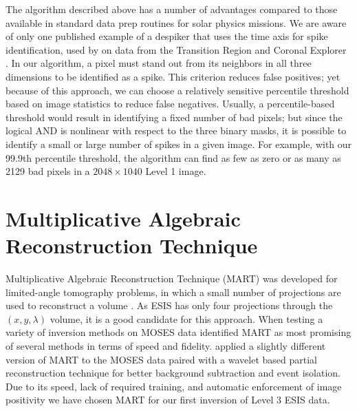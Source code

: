 The algorithm described above has a number of advantages compared to those available in standard data prep routines for solar physics missions. 
We are aware of only one published example of a despiker that uses the time axis for spike identification, used by \citet{Aschwanden2000(trace_unspike_time)} on data from the Transition Region and Coronal Explorer \citep[TRACE]{handy1999}. 
In our algorithm, a pixel must stand out from its neighbors in all three dimensions to be identified as a spike.
This criterion reduces false positives; yet because of this approach, we can choose a relatively sensitive percentile threshold based on image statistics to reduce false negatives. 
Usually, a percentile-based threshold would result in identifying a fixed number of bad pixels; but since the logical AND is nonlinear with respect to the three binary masks, it is possible to identify a small or large number of spikes in a given image. 
For example, with our 99.9th percentile threshold, the algorithm can find as few as zero or as many as 2129 bad pixels in a $2048\times 1040$ Level 1 image. 

\section{Multiplicative Algebraic Reconstruction Technique}\label{MART}
	Multiplicative Algebraic Reconstruction Technique (MART) was developed for limited-angle tomography problems, in which a small number of projections are used to reconstruct a volume \citep{Okamoto1991,Verhoeven1993}. 
	As ESIS has only four projections through the $(x,y,\lambda)$ volume, it is a good candidate for this approach.
	When testing a variety of inversion methods on MOSES data \citet{FoxPhD} identified MART as most promising of several methods in terms of speed and fidelity.
	\citet{RustPhD} applied a slightly different version of MART to the MOSES data paired with a wavelet based partial reconstruction technique for better background subtraction and event isolation.
	Due to its speed, lack of required training, and automatic enforcement of image positivity we have chosen MART for our first inversion of Level 3 ESIS data.
	
	
